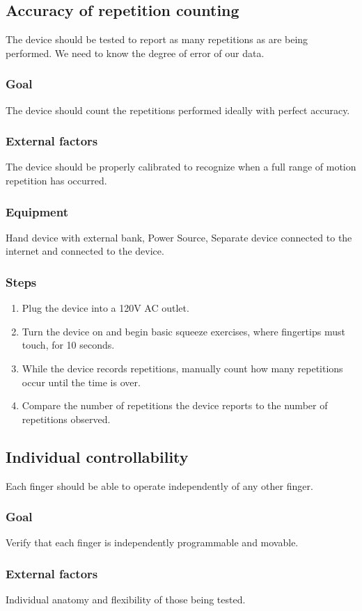 \documentclass{article}
\begin{document}
\subsection{Accuracy of repetition counting}
The device should be tested to report as many repetitions as are being performed. We need to know the degree of error of our data.
\subsubsection{Goal} The device should count the repetitions performed ideally with perfect accuracy.
\subsubsection{External factors} The device should be properly calibrated to recognize when a full range of motion repetition has occurred.
\subsubsection{Equipment} Hand device with external bank, Power Source, Separate device connected to the internet and connected to the device.
\subsubsection{Steps}
\begin{enumerate}
\item Plug the device into a 120V AC outlet.
\item Turn the device on and begin basic squeeze exercises, where fingertips must touch, for 10 seconds.
\item While the device records repetitions, manually count how many repetitions occur until the time is over.
\item Compare the number of repetitions the device reports to the number of repetitions observed.
\end{enumerate}
\subsection{Individual controllability} Each finger should be able to operate independently of any other finger.
\subsubsection{Goal} Verify that each finger is independently programmable and movable.
\subsubsection{External factors} Individual anatomy and flexibility of those being tested.
\end{document}
